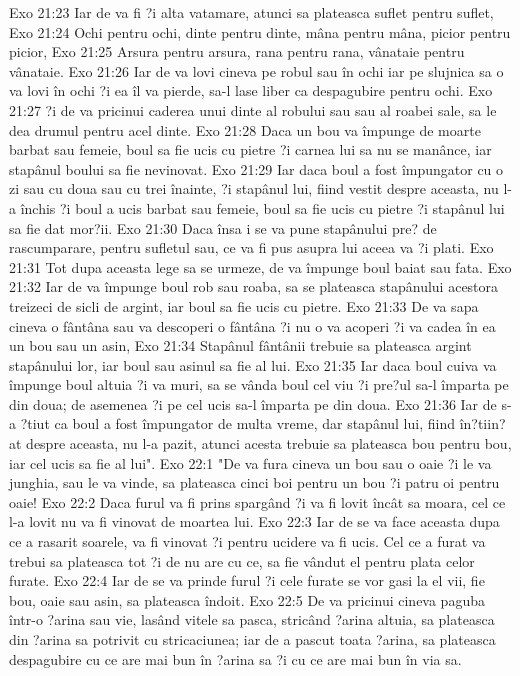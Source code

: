 Exo 21:23  Iar de va fi ?i alta vatamare, atunci sa plateasca suflet pentru suflet,
Exo 21:24  Ochi pentru ochi, dinte pentru dinte, mâna pentru mâna, picior pentru picior,
Exo 21:25  Arsura pentru arsura, rana pentru rana, vânataie pentru vânataie.
Exo 21:26  Iar de va lovi cineva pe robul sau în ochi iar pe slujnica sa o va lovi în ochi ?i ea îl va pierde, sa-l lase liber ca despagubire pentru ochi.
Exo 21:27  ?i de va pricinui caderea unui dinte al robului sau sau al roabei sale, sa le dea drumul pentru acel dinte.
Exo 21:28  Daca un bou va împunge de moarte barbat sau femeie, boul sa fie ucis cu pietre ?i carnea lui sa nu se manânce, iar stapânul boului sa fie nevinovat.
Exo 21:29  Iar daca boul a fost împungator cu o zi sau cu doua sau cu trei înainte, ?i stapânul lui, fiind vestit despre aceasta, nu l-a închis ?i boul a ucis barbat sau femeie, boul sa fie ucis cu pietre ?i stapânul lui sa fie dat mor?ii.
Exo 21:30  Daca însa i se va pune stapânului pre? de rascumparare, pentru sufletul sau, ce va fi pus asupra lui aceea va ?i plati.
Exo 21:31  Tot dupa aceasta lege sa se urmeze, de va împunge boul baiat sau fata.
Exo 21:32  Iar de va împunge boul rob sau roaba, sa se plateasca stapânului acestora treizeci de sicli de argint, iar boul sa fie ucis cu pietre.
Exo 21:33  De va sapa cineva o fântâna sau va descoperi o fântâna ?i nu o va acoperi ?i va cadea în ea un bou sau un asin,
Exo 21:34  Stapânul fântânii trebuie sa plateasca argint stapânului lor, iar boul sau asinul sa fie al lui.
Exo 21:35  Iar daca boul cuiva va împunge boul altuia ?i va muri, sa se vânda boul cel viu ?i pre?ul sa-l împarta pe din doua; de asemenea ?i pe cel ucis sa-l împarta pe din doua.
Exo 21:36  Iar de s-a ?tiut ca boul a fost împungator de multa vreme, dar stapânul lui, fiind în?tiin?at despre aceasta, nu l-a pazit, atunci acesta trebuie sa plateasca bou pentru bou, iar cel ucis sa fie al lui".
Exo 22:1  "De va fura cineva un bou sau o oaie ?i le va junghia, sau le va vinde, sa plateasca cinci boi pentru un bou ?i patru oi pentru oaie!
Exo 22:2  Daca furul va fi prins spargând ?i va fi lovit încât sa moara, cel ce l-a lovit nu va fi vinovat de moartea lui.
Exo 22:3  Iar de se va face aceasta dupa ce a rasarit soarele, va fi vinovat ?i pentru ucidere va fi ucis. Cel ce a furat va trebui sa plateasca tot ?i de nu are cu ce, sa fie vândut el pentru plata celor furate.
Exo 22:4  Iar de se va prinde furul ?i cele furate se vor gasi la el vii, fie bou, oaie sau asin, sa plateasca îndoit.
Exo 22:5  De va pricinui cineva paguba într-o ?arina sau vie, lasând vitele sa pasca, stricând ?arina altuia, sa plateasca din ?arina sa potrivit cu stricaciunea; iar de a pascut toata ?arina, sa plateasca despagubire cu ce are mai bun în ?arina sa ?i cu ce are mai bun în via sa.
